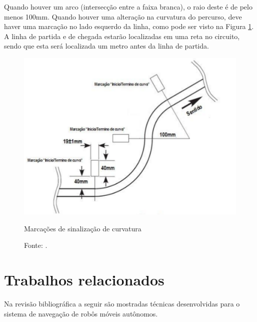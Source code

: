Quando houver um arco (intersecção entre a faixa branca), o raio deste é de pelo menos 100mm. Quando houver uma 
alteração na curvatura do percurso, deve haver uma marcação no lado esquerdo da linha, como pode ser visto na Figura 
\ref{fig:percurso4}. A linha de partida e de chegada estarão localizadas em uma reta no circuito, sendo que esta será localizada 
um metro antes da linha de partida.\par

\begin{figure}[t!]
 \centering
 \captionsetup{width=0.68\textwidth,font=footnotesize,textfont=bf}
 \includegraphics[scale=0.6]{figuras/Percurso4.png}
 \caption{Marcações de sinalização de curvatura \label{fig:percurso4}}
 \vspace{-0.3cm}
 \caption*{Fonte: \cite[p.4]{RegrasRobocore}.}
\end{figure}





\vspace{1cm}
\section{Trabalhos relacionados} \label{cap:trabRel}

Na revisão bibliográfica a seguir são mostradas técnicas desenvolvidas para o sistema de navegação de robôs móveis autônomos.

